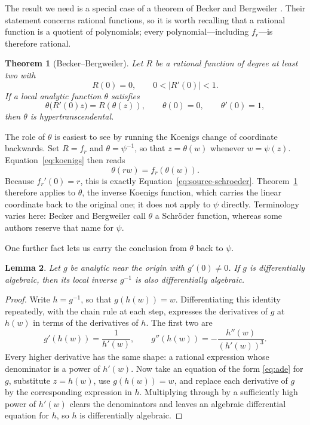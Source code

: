 \documentclass[11pt]{article}
\newtheorem{theorem}{Theorem}
\newtheorem{lemma}[theorem]{Lemma}
\begin{document}
The result we need is a special case of a theorem of Becker and Bergweiler \cite{BeckerBergweiler1995}. Their statement concerns rational functions, so it is worth recalling that a rational function is a quotient of polynomials; every polynomial---including $f_r$---is therefore rational.

\begin{theorem}[Becker--Bergweiler]\label{thm:bb}
Let $R$ be a rational function of degree at least two with
\[
 R(0)=0,
 \qquad
 0<|R'(0)|<1.
\]
If a local analytic function $\theta$ satisfies
\begin{equation}\label{eq:source-schroeder}
 \theta\bigl(R'(0)z\bigr)=R(\theta(z)),
 \qquad
 \theta(0)=0,
 \qquad
 \theta'(0)=1,
\end{equation}
then $\theta$ is hypertranscendental.
\end{theorem}


The role of $\theta$ is easiest to see by running the Koenigs change of coordinate backwards. Set $R=f_r$ and $\theta=\psi^{-1}$, so that $z=\theta(w)$ whenever $w=\psi(z)$. Equation~\eqref{eq:koenigs} then reads
\[
 \theta(rw)=f_r(\theta(w)).
\]
Because $f_r'(0)=r$, this is exactly Equation~\eqref{eq:source-schroeder}. Theorem~\ref{thm:bb} therefore applies to $\theta$, the inverse Koenigs function, which carries the linear coordinate back to the original one; it does not apply to $\psi$ directly. Terminology varies here: Becker and Bergweiler call $\theta$ a Schr\"oder function, whereas some authors reserve that name for $\psi$.

One further fact lets us carry the conclusion from $\theta$ back to $\psi$.

\begin{lemma}\label{lem:inverse}
Let $g$ be analytic near the origin with $g'(0)\neq0$. If $g$ is differentially algebraic, then its local inverse $g^{-1}$ is also differentially algebraic.
\end{lemma}

\begin{proof}
Write $h=g^{-1}$, so that $g(h(w))=w$. Differentiating this identity repeatedly, with the chain rule at each step, expresses the derivatives of $g$ at $h(w)$ in terms of the derivatives of $h$. The first two are
\[
 g'(h(w))=\frac{1}{h'(w)},
 \qquad
 g''(h(w))=-\frac{h''(w)}{(h'(w))^3}.
\]
Every higher derivative has the same shape: a rational expression whose denominator is a power of $h'(w)$. Now take an equation of the form \eqref{eq:ade} for $g$, substitute $z=h(w)$, use $g(h(w))=w$, and replace each derivative of $g$ by the corresponding expression in $h$. Multiplying through by a sufficiently high power of $h'(w)$ clears the denominators and leaves an algebraic differential equation for $h$, so $h$ is differentially algebraic.
\end{proof}
\end{document}
